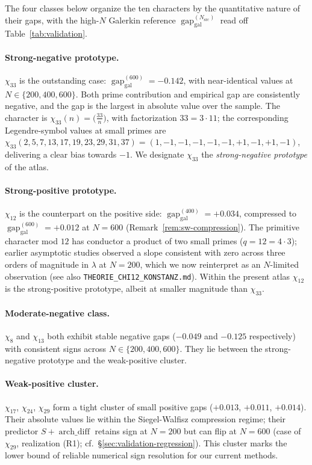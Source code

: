 \documentclass[a4paper,10pt,twocolumn]{article}
\theoremstyle{definition}
\theoremstyle{remark}
\newcommand{\gap}{\operatorname{gap}}
\newcommand{\chifn}{\chi}
\newcommand{\archdiff}{\operatorname{arch\_diff}}
\begin{document}
The four classes below organize the ten characters by the
quantitative nature of their gaps, with the high-$N$ Galerkin
reference $\gap_{\mathrm{gal}}^{(N_{\mathrm{src}})}$ read off
Table~\ref{tab:validation}.

\paragraph{Strong-negative prototype.}
$\chifn_{33}$ is the outstanding case:
$\gap_{\mathrm{gal}}^{(600)}=-0.142$, with near-identical values at
$N\in\{200,400,600\}$. Both prime contribution and empirical gap
are consistently negative, and the gap is the largest in absolute
value over the sample. The character is
$\chifn_{33}(n)=\bigl(\tfrac{33}{n}\bigr)$, with factorization
$33=3\cdot 11$; the corresponding Legendre-symbol values at small
primes are $\chifn_{33}(2,5,7,13,17,19,23,29,31,37)=
(1,-1,-1,-1,-1,-1,+1,-1,+1,-1)$, delivering a clear bias towards
$-1$. We designate $\chifn_{33}$ the \emph{strong-negative
prototype} of the atlas.

\paragraph{Strong-positive prototype.}
$\chifn_{12}$ is the counterpart on the positive side:
$\gap_{\mathrm{gal}}^{(400)}=+0.034$, compressed to
$\gap_{\mathrm{gal}}^{(600)}=+0.012$ at
$N=600$ (Remark~\ref{rem:sw-compression}). The primitive character
mod $12$ has conductor a product of two small primes ($q=12=
4\cdot 3$); earlier asymptotic studies \cite{AsymptoticScan} observed
a slope consistent with zero across three orders of magnitude in
$\lambda$ at $N=200$, which we now reinterpret as an $N$-limited
observation (see also \texttt{THEORIE\_CHI12\_KONSTANZ.md}). Within
the present atlas $\chifn_{12}$ is the strong-positive prototype,
albeit at smaller magnitude than $\chifn_{33}$.

\paragraph{Moderate-negative class.}
$\chifn_8$ and $\chifn_{13}$ both exhibit stable negative gaps
($-0.049$ and $-0.125$ respectively) with consistent signs across
$N\in\{200,400,600\}$. They lie between the strong-negative
prototype and the weak-positive cluster.

\paragraph{Weak-positive cluster.}
$\chifn_{17}$, $\chifn_{24}$, $\chifn_{29}$ form a tight cluster of
small positive gaps ($+0.013$, $+0.011$, $+0.014$). Their absolute
values lie within the Siegel-Walfisz compression regime; their
predictor $S+\archdiff$ retains sign at $N=200$ but can flip at
$N=600$ (case of $\chifn_{29}$, realization (R1); cf.\
\S\ref{sec:validation-regression}). This cluster marks the lower
bound of reliable numerical sign resolution for our current
methods.
\end{document}
